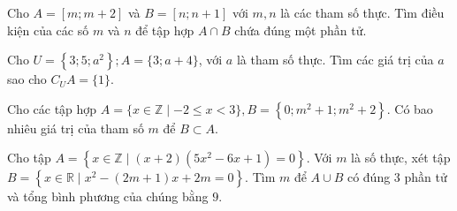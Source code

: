 \begin{bt}
	Cho $A=[m ; m+2]$ và $B=[n ; n+1]$ với $m, n$ là các tham số thực. Tìm điều kiện của các số $m$ và $n$ để tập hợp $A \cap B$ chứa đúng một phần tử.
\end{bt}

\begin{bt}
	Cho $U=\left\{3 ; 5 ; a^{2}\right\} ; A=\{3 ; a+4\}$, với $a$ là tham số thực. Tìm các giá trị của $a$ sao cho $C_{U} A=\{1\}$.
\end{bt}

\begin{bt}
	Cho các tập hợp $A=\{x \in \mathbb{Z} \mid-2 \leq x<3\}, B=\left\{0 ; m^{2}+1 ; m^{2}+2\right\}$. Có bao nhiêu giá trị của tham số $m$ để $B \subset A$.
\end{bt}

\begin{bt}
	Cho tập $A=\left\{x \in \mathbb{Z} \mid(x+2)\left(5 x^{2}-6 x+1\right)=0\right\}$. Với $m$ là số thực, xét tập $B=\left\{x \in \mathbb{R} \mid x^{2}-(2 m+1) x+2 m=0\right\}$. Tìm $m$ để $A \cup B$ có đúng 3 phần tử và tổng bình phương của chúng bằng $9$.
\end{bt}

